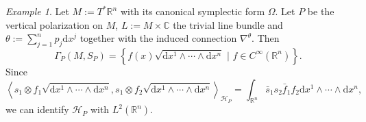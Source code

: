 \documentclass[12pt]{amsart}
\numberwithin{equation}{section}
\theoremstyle{plain}
\theoremstyle{definition}
\theoremstyle{remark}
\newtheorem{ex}{Example}[subsection]
\newcommand{\R}{\mathbb{R}}
\newcommand{\dd}{{\mathrm{d}}}
\newcommand{\calH}{\mathcal{H}}
\begin{document}
\begin{ex}
Let $M:=T^*\R^n$ with its canonical symplectic form $\Omega$. Let $P$ be the vertical polarization on $M$, $L:=M\times\mathbb{C}$ the trivial line bundle and $\theta:=\sum_{j=1}^np_j\dd x^j$ together with the induced connection $\nabla^\theta$. Then 
$$\Gamma_P(M,S_P)=\left\{ f(x)\sqrt{\dd x^1\land\dotsm \land \dd x^n}\,\,\big|\,\,  f\in C^\infty(\R^n)\right\}.$$
Since 
$$\left\langle s_1\otimes f_1\sqrt{\dd x^1\land\dotsm \land \dd x^n},s_1\otimes f_2\sqrt{\dd x^1\land\dotsm \land \dd x^n}\right\rangle_{\calH_P}=\int_{\R^n}\bar s_1s_2\bar f_1 f_2\dd x^1\land\dotsm \land \dd x^n,$$
we can identify $\calH_P$ with $L^2(\R^n)$.
\end{ex}























\printbibliography
\end{document}
